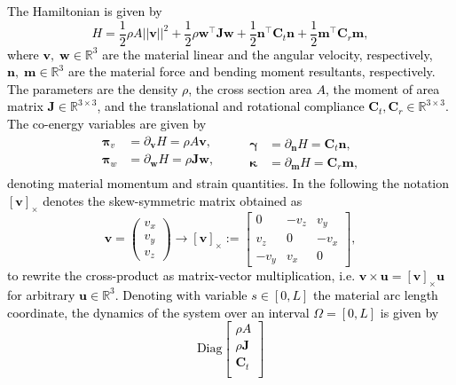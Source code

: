 \documentclass[11pt,a4paper]{article}
\newcommand{\revtwo}[1]{{\textcolor{black}{#1}}}
\begin{document}
\revtwo{
The Hamiltonian is given by 
$$
H = \frac{1}{2}\rho A ||\bm{v}||^2 +  \frac{1}{2}\rho \bm{w}^\top\bm{J}\bm{w} +  \frac{1}{2}\bm{n}^\top \bm{C}_t \bm{n} +  \frac{1}{2}\bm{m}^\top \bm{C}_r \bm{m},
$$
where $\bm{v}, \; \bm{w} \in \mathbb{R}^3$ are the {material} linear and the angular velocity, respectively, $\bm{n}, \; \bm{m} \in \mathbb{R}^3$ are the material force and bending moment resultants, respectively. The parameters are the density $\rho$, the cross section area $A$, the moment of area matrix $\bm{J} \in \mathbb{R}^{3\times 3}$, and the translational and rotational compliance $\bm{C}_t, \bm{C}_r \in \mathbb{R}^{3\times 3}$. 
The co-energy variables are given by
$$
\begin{aligned}
\bm{\pi}_v &= \partial_{\bm{v}} H = \rho A \bm{v}, \\
\bm{\pi}_w &= \partial_{\bm{w}} H = \rho \bm{J} \bm{w}, \\
\end{aligned}\qquad 
\begin{aligned}
\bm{\gamma} &= \partial_{\bm{n}} H = \bm{C}_t \bm{n}, \\
\bm{\kappa} &= \partial_{\bm{m}} H = \bm{C}_r \bm{m}, 
\end{aligned}
$$
denoting material momentum and strain quantities. 
In the following the notation $[\bm{v}]_\times$ denotes the skew-symmetric matrix obtained as
\begin{equation}
\bm{v} =
\begin{pmatrix}
v_x \\
v_y \\
v_z
\end{pmatrix}
\rightarrow
[\bm{v}]_\times :=
\begin{bmatrix}
0 & -v_z & v_y \\
v_z & 0 & -v_x \\
-v_y & v_x & 0
\end{bmatrix},
\end{equation}
to rewrite the cross-product as matrix-vector multiplication, i.e. $\bm{v} \times \bm{u} = [\bm{v}]_\times \bm{u}$ for arbitrary $\bm{u} \in \mathbb{R}^3.$ Denoting with variable ${s} \in [0, L]$ the material arc length coordinate, the dynamics of the system over an interval $\Omega=[0, L]$ is given by
\begin{equation}\label{eq:intrinsic_beam}
\mathrm{Diag}
\begin{bmatrix}
\rho A \\
\rho \bm{J} \\
\bm{C}_t\\

\end{bmatrix}
\end{equation}}
\end{document}
